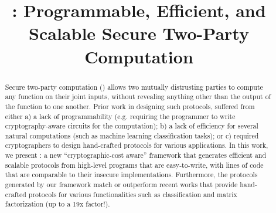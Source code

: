 \documentclass[conference,compsoc]{IEEEtran}
\begin{document}
\title{\tool: Programmable, Efficient, and Scalable Secure Two-Party Computation}





\maketitle
\begin{abstract}
Secure two-party computation (\mpc) allows two mutually distrusting parties to compute any function on their joint inputs, without revealing anything other than the output of the function to one another. %
 Prior work in designing such protocols, suffered from either a) a lack of programmability (e.g. requiring the programmer to write cryptography-aware circuits for the computation); b) a lack of efficiency for several natural computations (such as machine learning classification tasks); or c) required cryptographers to design hand-crafted protocols for various applications. In this work, we present \tool: a new ``cryptographic-cost aware'' \mpc framework that generates efficient and scalable \mpc protocols from high-level programs that 
are easy-to-write, with lines of code that are comparable to their insecure implementations. Furthermore, the \mpc protocols generated by our framework match or outperform recent works that provide hand-crafted \mpc protocols for various functionalities such as classification and matrix factorization (up to a 19x factor!).
\end{abstract}
\IEEEpeerreviewmaketitle
\end{document}
